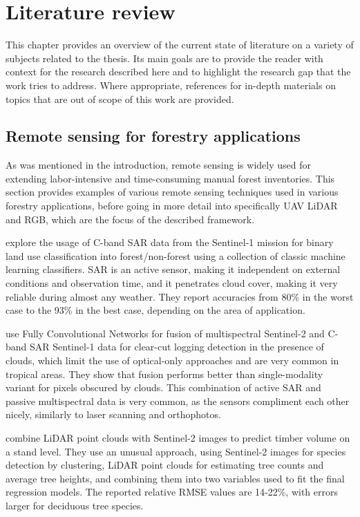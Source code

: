 \chapter{Literature review}\label{cap:literature}

This chapter provides an overview of the current state of literature on a variety of subjects related to the thesis.
Its main goals are to provide the reader with context for the research described here and to highlight the research gap that the work tries to address.
Where appropriate, references for in-depth materials on topics that are out of scope of this work are provided.

\section{Remote sensing for forestry applications}

As was mentioned in the introduction, remote sensing is widely used for extending labor-intensive and time-consuming manual forest inventories.
This section provides examples of various remote sensing techniques used in various forestry applications, before going in more detail into specifically UAV LiDAR and RGB, which are the focus of the described framework.

\citet{hansenAssessingForestNonForest2020} explore the usage of C-band SAR data from the Sentinel-1 mission for binary land use classification into forest/non-forest using a collection of classic machine learning classifiers.
SAR is an active sensor, making it independent on external conditions and observation time, and it penetrates cloud cover, making it very reliable during almost any weather.
They report accuracies from 80\% in the worst case to the 93\% in the best case, depending on the area of application.

\citet{ferrariFusingSentinel1Sentinel22023} use Fully Convolutional Networks \citep{longFullyConvolutionalNetworks2015} for fusion of multispectral Sentinel-2 and C-band SAR Sentinel-1 data for clear-cut logging detection in the presence of clouds, which limit the use of optical-only approaches and are very common in tropical areas.
They show that fusion performs better than single-modality variant for pixels obscured by clouds.
This combination of active SAR and passive multispectral data is very common, as the sensors compliment each other nicely, similarly to laser scanning and orthophotos.

\citet{sinica-sinavskisForestStandVolume2022} combine LiDAR point clouds with Sentinel-2 images to predict timber volume on a stand level.
They use an unusual approach, using Sentinel-2 images for species detection by clustering, LiDAR point clouds for estimating tree counts and average tree heights, and combining them into two variables used to fit the final regression models.
The reported relative RMSE values are 14-22\%, with errors larger for deciduous tree species.

